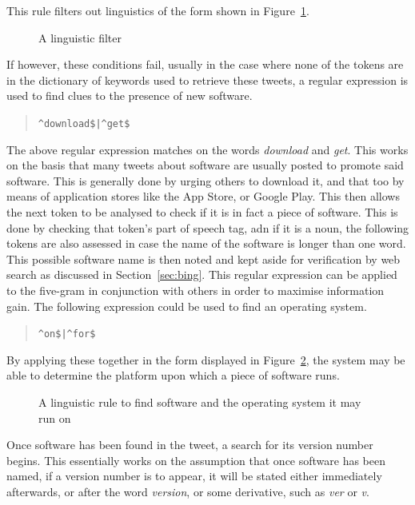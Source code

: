 This rule filters out linguistics of the form shown in Figure~\ref{fig:rule1}.
\begin{figure}[h!]
 \centering
  
  \caption{A linguistic filter
    \label{fig:rule1}}
\end{figure}
If however, these conditions fail, usually in the case where none of the tokens are in the dictionary of keywords used to retrieve these tweets, a regular expression is used to find clues to the presence of new software.

\begin{quote}
\verb~^download$|^get$~
\end{quote}

The above regular expression matches on the words \emph{download} and \emph{get}. This works on the basis that many tweets about software are usually posted to promote said software. This is generally done by urging others to download it, and that too by means of application stores like the App Store, or Google Play. This then allows the next token to be analysed to check if it is in fact a piece of software. This is done by checking that token's part of speech tag, adn if it is a noun, the following tokens are also assessed in case the name of the software is longer than one word. This possible software name is then noted and kept aside for verification by web search as discussed in Section~\ref{sec:bing}. This regular expression can be applied to the five-gram in conjunction with others in order to maximise information gain. The following expression could be used to find an operating system.

\begin{quote}
\verb~^on$|^for$~
\end{quote}

By applying these together in the form displayed in Figure~\ref{fig:rule2}, the system may be able to determine the platform upon which a piece of software runs.

\begin{figure}[h!]
 \centering
  
  \caption{A linguistic rule to find software and the operating system it may run on
    \label{fig:rule2}}
\end{figure}

Once software has been found in the tweet, a search for its version number begins. This essentially works on the assumption that once software has been named, if a version number is to appear, it will be stated either immediately afterwards, or after the word \emph{version}, or some derivative, such as \emph{ver} or \emph{v}.

